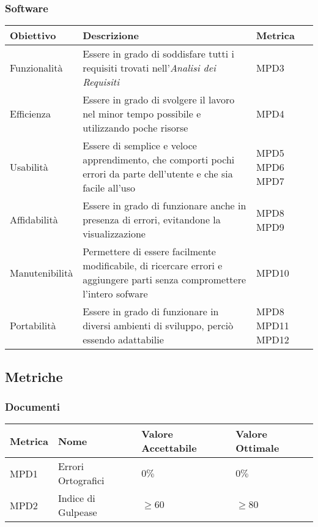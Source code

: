 \subsubsection{Software}
\begin{center}
  \begin{tabular}{|p{3cm}|p{7.5cm}|p{2cm}|} \hline
    \textbf{Obiettivo} & \textbf{Descrizione} & \textbf{Metrica}  \\ \hline
    Funzionalità & Essere in grado di soddisfare tutti i requisiti trovati nell'\textit{Analisi dei Requisiti}  & MPD3       \\ \hline
    Efficienza & Essere in grado di svolgere il lavoro nel minor tempo possibile e utilizzando poche risorse   & MPD4       \\ \hline
    Usabilità & Essere di semplice e veloce apprendimento, che comporti pochi errori da parte dell'utente e che sia facile all'uso  & MPD5 \newline MPD6 \newline MPD7    \\ \hline
    Affidabilità & Essere in grado di funzionare anche in presenza di errori, evitandone la visualizzazione  & MPD8 \newline MPD9       \\ \hline
    Manutenibilità & Permettere di essere facilmente modificabile, di ricercare errori e aggiungere parti senza compromettere l'intero sofware  & MPD10       \\ \hline
    Portabilità & Essere in grado di funzionare in diversi ambienti di sviluppo, perciò essendo adattabilie & MPD8 \newline MPD11 \newline MPD12       \\ \hline
  \end{tabular}
\end{center}


\subsection{Metriche}
\subsubsection{Documenti}
\begin{center}
  \begin{tabular}{|p{1.8cm}|p{3.5cm}|p{3.8cm}|p{3.3cm}|} \hline
    \textbf{Metrica} & \textbf{Nome} & \textbf{Valore Accettabile} & \textbf{Valore Ottimale}    \\ \hline
      MPD1 & Errori Ortografici    & $0\%$      & $0\%$        \\ \hline
      MPD2 & Indice di Gulpease    & $\geq60$   & $\geq80$     \\ \hline
  \end{tabular}
\end{center}

